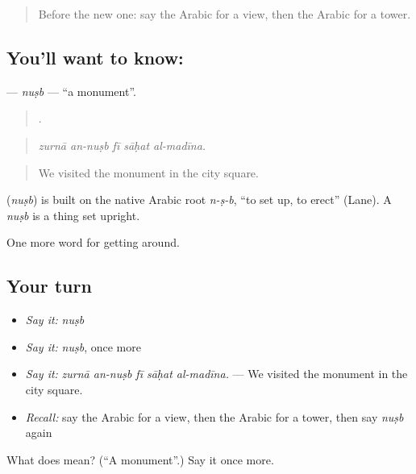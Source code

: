 \begin{quote}
Before the new one: say the Arabic for a view, then the Arabic for a tower.
\end{quote}

\subsection*{You'll want to know: }
\textbf{} — \emph{nuṣb} — \textquotedblleft{}a monument\textquotedblright{}.

\begin{quote}
    .
\end{quote}

\begin{quote}
\emph{zurnā an-nuṣb fī sāḥat al-madīna.}
\end{quote}

\begin{quote}
We visited the monument in the city square.
\end{quote}

\begin{cousinweb}
\textbf{} (\emph{nuṣb}) is built on the native Arabic root \emph{n-ṣ-b}, \textquotedblleft{}to set up, to erect\textquotedblright{} (Lane). A \emph{nuṣb} is a thing set upright.
\end{cousinweb}

\begin{grammarlens}[title={What you've built}]
One more word for getting around.
\end{grammarlens}

\subsection*{Your turn}
\begin{itemize}
\raggedright
  \item \emph{Say it:} \emph{nuṣb}
  \item \emph{Say it:} \emph{nuṣb}, once more
  \item \emph{Say it:} \emph{zurnā an-nuṣb fī sāḥat al-madīna.} — We visited the monument in the city square.
  \item \emph{Recall:} say the Arabic for a view, then the Arabic for a tower, then say \emph{nuṣb} again
\end{itemize}

\begin{tcolorbox}[breakable,colback=teal!4,colframe=teal!35!black,title={Before you move on}]
What does  mean? (\textquotedblleft{}A monument\textquotedblright{}.) Say it once more.
\end{tcolorbox}
